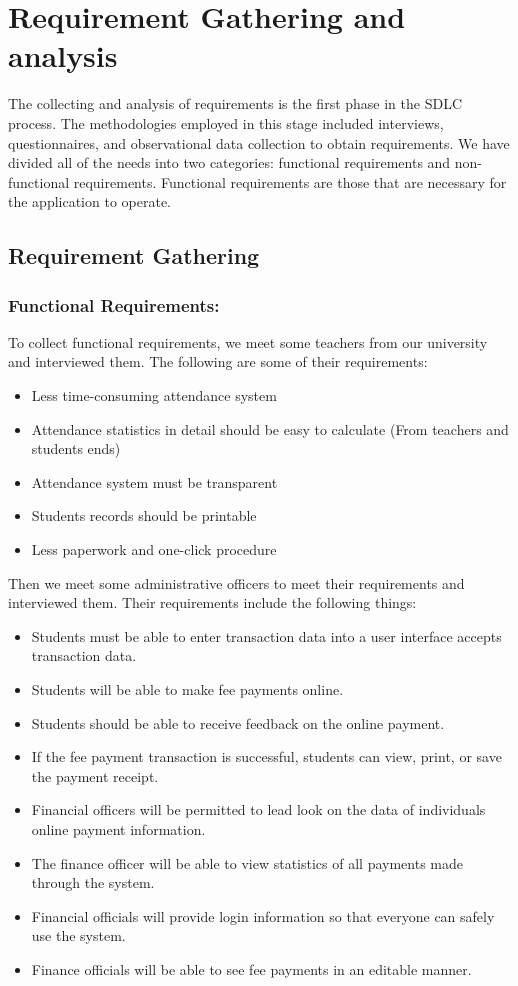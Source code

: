 \section{Requirement Gathering and analysis}\label{sec:rga}
The collecting and analysis of requirements is the first phase in the SDLC process. The methodologies employed in this stage included interviews, questionnaires, and observational data collection to obtain requirements. We have divided all of the needs into two categories: functional requirements and non-functional requirements. Functional requirements are those that are necessary for the application to operate.
\subsection{Requirement Gathering}\label{sub:reqgather}
\subsubsection{Functional Requirements:}\label{subsub:funreq}
To collect functional requirements, we meet some teachers from our university and interviewed them. The following are some of their requirements:
\begin{itemize}
	\item Less time-consuming attendance system 
	\item Attendance statistics in detail  should be easy to calculate (From teachers and students ends)
	\item Attendance system must be transparent
	\item Students records should be printable
	\item Less paperwork and one-click procedure
\end{itemize}
Then we meet some administrative officers to meet their requirements and interviewed them. Their requirements include the following things:
\begin{itemize}
	\item Students must be able to enter transaction data into a user interface accepts transaction data.
	\item Students will be able to make fee payments online.
	\item Students should be able to receive feedback on the  online payment.
	\item If the fee payment transaction is successful, students can view, print, or save the payment receipt.
	\item Financial officers will be permitted to lead look on the data of individuals online payment information.
	\item The finance officer will be able to view statistics of all payments made through the system.
	\item Financial officials will provide login information so that  everyone can safely use the system.
	\item Finance officials will be able to see fee payments in an editable manner.
\end{itemize}
